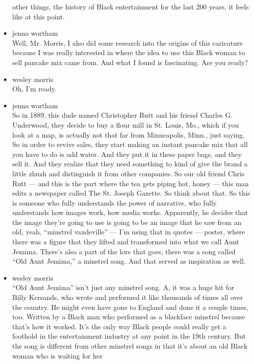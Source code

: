 \begin{itemize}
  other things, the history of Black entertainment for the last 200
  years, it feels like at this point.
\item
  jenna wortham\\
  Well, Mr. Morris, I also did some research into the origins of this
  caricature because I was really interested in where the idea to use
  this Black woman to sell pancake mix came from. And what I found is
  fascinating. Are you ready?
\item
  wesley morris\\
  Oh, I'm ready.
\item
  jenna wortham\\
  So in 1889, this dude named Christopher Rutt and his friend Charles G.
  Underwood, they decide to buy a flour mill in St. Louis, Mo., which if
  you look at a map, is actually not that far from Minneapolis, Minn.,
  just saying. So in order to revive sales, they start making an instant
  pancake mix that all you have to do is add water. And they put it in
  these paper bags, and they sell it. And they realize that they need
  something to kind of give the brand a little zhuzh and distinguish it
  from other companies. So our old friend Chris Rutt --- and this is the
  part where the tea gets piping hot, honey --- this man edits a
  newspaper called The St. Joseph Gazette. So think about that. So this
  is someone who fully understands the power of narrative, who fully
  understands how images work, how media works. Apparently, he decides
  that the image they're going to use is going to be an image that he
  saw from an old, yeah, ``minstrel vaudeville'' --- I'm using that in
  quotes --- poster, where there was a figure that they lifted and
  transformed into what we call Aunt Jemima. There's also a part of the
  lore that goes, there was a song called ``Old Aunt Jemima,'' a
  minstrel song. And that served as inspiration as well.
\item
  wesley morris\\
  ``Old Aunt Jemima'' isn't just any minstrel song. A, it was a huge hit
  for Billy Kersands, who wrote and performed it like thousands of times
  all over the country. He might even have gone to England and done it a
  couple times, too. Written by a Black man who performed as a blackface
  minstrel because that's how it worked. It's the only way Black people
  could really get a foothold in the entertainment industry at any point
  in the 19th century. But the song is different from other minstrel
  songs in that it's about an old Black woman who is waiting for her

\end{itemize}
